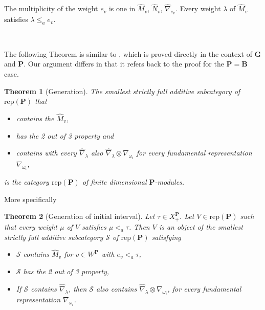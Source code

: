 \documentclass[sn-mathphys-num]{sn-jnl}%
\newcommand\tS{{\mathcal S}}
\newcommand{\rep}{{\mathrm{rep}}}
\newcommand{\bg}{\mathbf G}
\newcommand{\fb}{\mathbf B}
\newcommand{\bp}{\mathbf P}
\newtheorem{theorem}{Theorem}[section]
\theoremstyle{definition}
\begin{document}
  The multiplicity of the weight $e_v$ is one in $\hat M_v$, $\hat N_v$, $\hat\nabla_{e_v}$. 
  Every weight $\lambda$ of $\hat M_v$ satisfies $\lambda\leq_a e_v$.

\

  The following Theorem is similar to \cite[Theorem 2]{Ana}, which is proved directly in the context of $\bg$ and $\bp$. Our argument differs in that it refers back to the proof for the $\bp=\fb$ case.
  \begin{theorem}[Generation]\label{th:Pgeneration}
  The smallest strictly full additive subcategory of $\rep(\bp)$ that 
  \begin{itemize}
  \item contains the $\hat M_v$,  
  \item has the
  2 out of 3 property and 
  \item contains with every $\hat\nabla_\lambda$ also
   $\hat\nabla_\lambda\otimes\nabla_{\omega_i}$ for every fundamental representation $\nabla_{\omega_i}$,
  \end{itemize}
   is the category $\rep( \bp )$ of finite dimensional $ \bp $-modules.

  \end{theorem}  
  
  More specifically
  
  \begin{theorem}[Generation of initial interval]\label{th:intervalgeneration}
  Let $\tau\in X^\bp_+$. Let $V\in\rep(\bp)$ such that every weight $\mu$ of $V$ satisfies $\mu<_a\tau$.
Then  $V$ is an object of
  the smallest strictly full additive subcategory $\tS$ of $\rep(\bp)$ 
  satisfying 
  \begin{itemize}
  \item $\tS$ contains $\hat M_v$ for $v\in W^\bp$ with $e_v<_a\tau$,  
  \item  $\tS$ has the
  2 out of 3 property,
 \item  If  $\tS$ contains $\hat\nabla_\lambda$, then $\tS$ also contains
   $\hat\nabla_\lambda\otimes\nabla_{\omega_i}$, for every fundamental representation $\nabla_{\omega_i}$. 
  \end{itemize}
  \end{theorem}  
\end{document}
